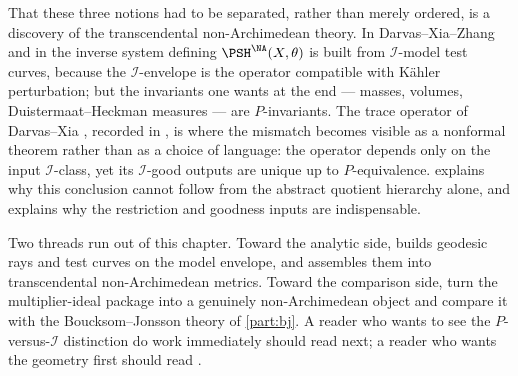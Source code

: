 That these three notions had to be separated, rather than merely ordered,
is a discovery of the transcendental non-Archimedean theory.  In
Darvas--Xia--Zhang \cite{DXZ23} and in \cite{Xia21,Xia23Operations} the
inverse system defining \(\PSH^{\NA}(X,\theta)\) is built from
\(\mathcal I\)-model test curves, because the \(\mathcal I\)-envelope is
the operator compatible with K\"ahler perturbation; but the invariants one
wants at the end --- masses, volumes, Duistermaat--Heckman measures ---
are \(P\)-invariants.  The trace operator of Darvas--Xia \cite{DX24},
recorded in , is where the mismatch becomes
visible as a nonformal theorem rather than as a choice of language: the
operator depends only on the input \(\mathcal I\)-class, yet its
\(\mathcal I\)-good outputs are unique up to \(P\)-equivalence.
 explains why this conclusion cannot follow from the
abstract quotient hierarchy alone, and 
explains why the restriction and goodness inputs are indispensable.

Two threads run out of this chapter.  Toward the analytic side,
 builds geodesic rays and test curves on the
model envelope, and  assembles them
into transcendental non-Archimedean metrics.  Toward the comparison side,
 turn the
multiplier-ideal package into a genuinely non-Archimedean object and
compare it with the Boucksom--Jonsson theory of \cref{part:bj}.  A reader
who wants to see the \(P\)-versus-\(\mathcal I\) distinction do work
immediately should read  next; a reader who
wants the geometry first should read .
